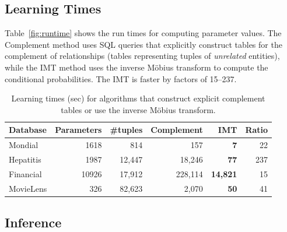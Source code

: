 \documentclass[oribibl]{llncs}
\begin{document}
\subsection{Learning Times} \label{sec:learning-times}

Table~\ref{fig:runtime} shows the run times for computing parameter values. The Complement method uses SQL queries that explicitly construct tables for the complement of relationships (tables representing tuples of {\em unrelated} entities), while the IMT  method uses the inverse M\"obius transform to compute the conditional probabilities. The IMT is faster by factors of 15--237.

\begin{table}[htdp]
\caption{Learning times (sec) for algorithms that construct explicit complement tables or use the inverse M\"obius transform.\label{fig:runtime}}
\begin{center}
\begin{tabular}{|l|r|r||r|r||r|}
\hline Database & Parameters & \#tuples & Complement & IMT & Ratio \\  \hline
Mondial & 1618 & 814&157 & \textbf{7} &22 \\
Hepatitis & 1987 &  12,447 & 18,246 & \textbf{77} & 237 \\
Financial & 10926 & 17,912 & 228,114  & \textbf{14,821} &15 \\
MovieLens & 326 & 82,623 & 2,070  & \textbf{50} & 41 \\ \hline
\end{tabular}
\end{center}
\label{table:runtime}
\end{table}%




\subsection{Inference}\label{sec:inference}
\end{document}
